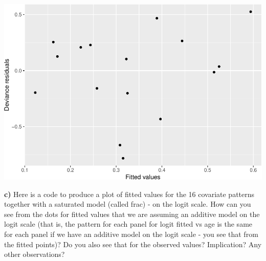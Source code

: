 \documentclass[
]{article}
\newenvironment{Shaded}{\begin{snugshade}}{\end{snugshade}}
\newcommand{\AttributeTok}[1]{\textcolor[rgb]{0.13,0.29,0.53}{#1}}
\newcommand{\FunctionTok}[1]{\textcolor[rgb]{0.13,0.29,0.53}{\textbf{#1}}}
\newcommand{\NormalTok}[1]{#1}
\newcommand{\OtherTok}[1]{\textcolor[rgb]{0.56,0.35,0.01}{#1}}
\newcommand{\SpecialCharTok}[1]{\textcolor[rgb]{0.81,0.36,0.00}{\textbf{#1}}}
\newcommand{\StringTok}[1]{\textcolor[rgb]{0.31,0.60,0.02}{#1}}
\begin{document}
\begin{Shaded}
\end{Shaded}

\includegraphics{3BinReg_files/figure-latex/unnamed-chunk-47-1.pdf}

\textbf{c)} Here is a code to produce a plot of fitted values for the 16
covariate patterns together with a saturated model (called frac) - on
the logit scale. How can you see from the dots for fitted values that we
are assuming an additive model on the logit scale (that is, the pattern
for each panel for logit fitted vs age is the same for each panel if we
have an additive model on the logit scale - you see that from the fitted
points)? Do you also see that for the observed values? Implication? Any
other observations?
\end{document}
